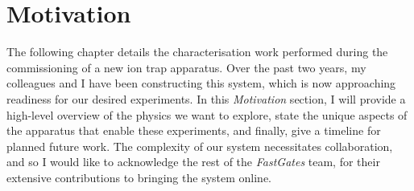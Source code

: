 \section{Motivation}

    The following chapter details the characterisation work performed during the
    commissioning of a new ion trap apparatus. Over the past two years, my
    colleagues and I have been constructing this system, which is now
    approaching readiness for our desired experiments. In this
    \textit{Motivation} section, I will provide a high-level overview of the
    physics we want to explore, state the unique aspects of the apparatus that
    enable these experiments, and finally, give a timeline for planned future
    work. The complexity of our system necessitates collaboration, and so I
    would like to acknowledge the rest of the \emph{FastGates} team, for their
    extensive contributions to bringing the system online. \\

